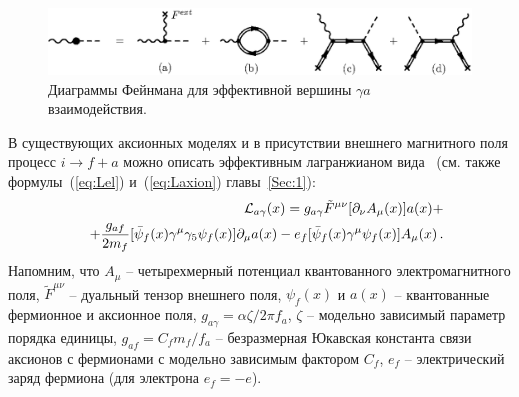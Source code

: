 \begin{figure}
\centerline{\includegraphics[width=15cm]{fig5_2.eps}}
\caption{ Диаграммы Фейнмана для эффективной вершины $\gamma a$ 
взаимодействия.}
\label{fig:vertexaxion}
\end{figure}



 В существующих аксионных моделях и в присутствии 
внешнего магнитного поля процесс  $i \to f+a$ 
можно описать эффективным лагранжианом вида~\cite{Raffelt:1996} 
(см. также формулы~(\ref{eq:Lel}) и~(\ref{eq:Laxion}) главы~\ref{Sec:1}):
%
\begin{eqnarray}
\label{eq:L1}
&&{\cal L}_{a\gamma}(x) = g_{a\gamma}\tilde F^{\mu \nu} [\partial_{\nu}A_{\mu}(x)] a(x) + 
\\
\nonumber
&& + \frac{g_{af}}{2m_f} 
[\bar \psi_f(x) \gamma^{\mu} \gamma_5 \psi_f(x)] \partial_{\mu} a(x) - 
 e_f[\bar \psi_f(x) \gamma^{\mu} \psi_f(x)]A_{\mu}(x) \, .
\end{eqnarray}
%
\noindent Напомним, что  $A_{\mu}$ -- четырехмерный потенциал квантованного электромагнитного
поля, $\tilde F^{\mu \nu}$ --  дуальный тензор внешнего поля,  $\psi_f(x)$  и $a(x)$ --  
квантованные фермионное и аксионное поля, 
  $g_{a\gamma} = \alpha \zeta/2\pi f_a$, $\zeta$ --  модельно зависимый 
параметр порядка единицы, 
$g_{af} = C_f m_f/f_a$ -- безразмерная Юкавская константа связи аксионов с 
фермионами с модельно зависимым фактором $C_f$, $e_f$ -- электрический заряд 
фермиона (для электрона $e_f = - e$). 


